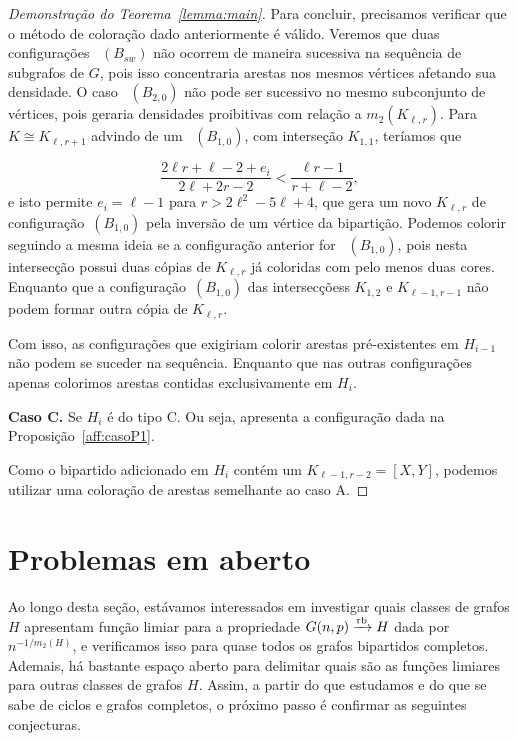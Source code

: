 \documentclass[12pt,a4paper]{book}
\newcommand{\K}{K_{\ell,r}} %
\def\rbarrow{\xrightarrow[]{\raisebox{0.0mm}[0mm]{$\scriptstyle \rm rb$}}}
\begin{document}
\begin{proof}[Demonstração do Teorema~\ref{lemma:main}]
        Para concluir, precisamos verificar que o método de coloração dado anteriormente é válido.
        Veremos que duas configurações ~\hyperref[configB]{$(B_{sw})$} não ocorrem de maneira sucessiva na sequência de subgrafos  de $G$, pois isso concentraria arestas nos mesmos vértices afetando sua densidade. %
        O caso ~\hyperref[configB]{$(B_{2,0})$} não pode ser sucessivo no mesmo subconjunto de vértices, pois geraria densidades proibitivas com relação a $m_2(\K)$.
        Para $K \cong K_{\ell,r+1}$ advindo de um ~\hyperref[configB]{$(B_{1,0})$}, com interseção $K_{1,1}$, teríamos que 
        
        \[
            \frac{2\ell r+\ell-2+e_i}{2\ell+2r-2} < \frac{\ell
r-1}{r+\ell-2},
        \]
        e isto permite $e_i = \ell-1$ para $r > 2\ell^2-5\ell+4$,
        que gera um novo $\K$ de configuração~\hyperref[configB]{$(B_{1,0})$} pela inversão de um vértice da bipartição.
         Podemos colorir seguindo a mesma ideia se a configuração anterior for ~\hyperref[configB]{$(B_{1,0})$}, pois nesta intersecção possui duas cópias de $\K$ já coloridas com pelo menos duas cores.
        Enquanto que a configuração~\hyperref[configB]{$(B_{1,0})$}
 das intersecçõess $K_{1,2}$ e $K_{\ell-1,r-1}$ não podem formar outra cópia de $\K$.  

 
        Com isso, as configurações que exigiriam colorir arestas pré-existentes em $H_{i-1}$ não podem se suceder na sequência.
        Enquanto que nas outras configurações apenas colorimos arestas contidas exclusivamente em $H_{i}$.

        \medskip \textbf{Caso C.} Se $H_i$ é do tipo C. Ou seja, apresenta a configuração dada na Proposição~\ref{aff:casoP1}.

        Como o bipartido adicionado em $H_i$ contém um $K_{\ell-1,r-2}=[X,Y]$, podemos utilizar uma coloração de arestas semelhante ao caso A.
        
     \end{proof}
 
  
  
\section{Problemas em aberto}
\label{subsec:bipartido-prob}
Ao longo desta seção, estávamos interessados em investigar quais classes de grafos $H$ apresentam função limiar para a propriedade $G(n,p)\rbarrow H$  dada por $n^{-1/m_2(H)}$, 
e verificamos isso para quase todos os grafos bipartidos completos.
Ademais, há bastante espaço aberto para delimitar quais são as funções limiares para outras classes de grafos $H$. 
Assim, a partir do que estudamos e do que se sabe de ciclos e grafos completos, o próximo passo é confirmar as seguintes conjecturas. %
\end{document}
